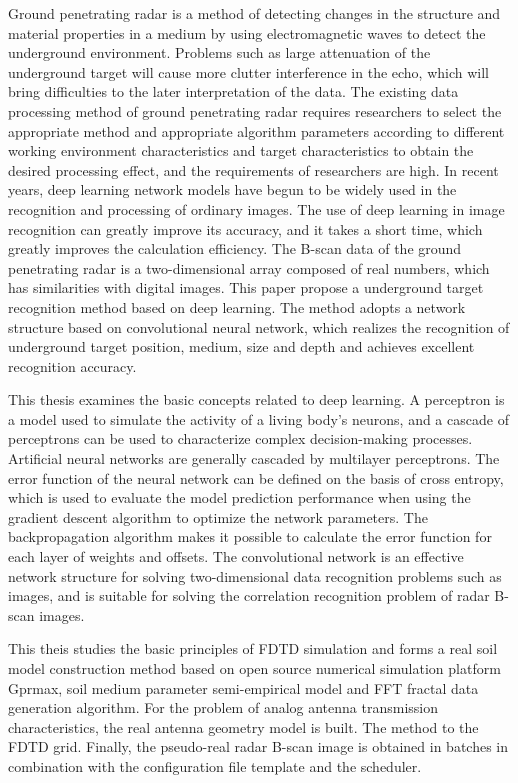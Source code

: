 
\begin{englishabstract}
	Ground penetrating radar is a method of detecting changes in the structure and material properties in a medium by using electromagnetic waves to detect the underground environment. Problems such as large attenuation of the underground target will cause more clutter interference in the echo, which will bring difficulties to the later interpretation of the data. The existing data processing method of ground penetrating radar requires researchers to select the appropriate method and appropriate algorithm parameters according to different working environment characteristics and target characteristics to obtain the desired processing effect, and the requirements of researchers are high. In recent years, deep learning network models have begun to be widely used in the recognition and processing of ordinary images. The use of deep learning in image recognition can greatly improve its accuracy, and it takes a short time, which greatly improves the calculation efficiency. The B-scan data of the ground penetrating radar is a two-dimensional array composed of real numbers, which has similarities with digital images. This paper propose a underground target recognition method based on deep learning. The method adopts a network structure based on convolutional neural network, which realizes the recognition of underground target position, medium, size and depth and achieves excellent recognition accuracy. 
	
	This thesis examines the basic concepts related to deep learning. A perceptron is a model used to simulate the activity of a living body's neurons, and a cascade of perceptrons can be used to characterize complex decision-making processes. Artificial neural networks are generally cascaded by multilayer perceptrons. The error function of the neural network can be defined on the basis of cross entropy, which is used to evaluate the model prediction performance when using the gradient descent algorithm to optimize the network parameters. The backpropagation algorithm makes it possible to calculate the error function for each layer of weights and offsets. The convolutional network is an effective network structure for solving two-dimensional data recognition problems such as images, and is suitable for solving the correlation recognition problem of radar B-scan images. 
	
	This theis studies the basic principles of FDTD simulation and forms a real soil model construction method based on open source numerical simulation platform Gprmax, soil medium parameter semi-empirical model and FFT fractal data generation algorithm. For the problem of analog antenna transmission characteristics, the real antenna geometry model is built. The method to the FDTD grid. Finally, the pseudo-real radar B-scan image is obtained in batches in combination with the configuration file template and the scheduler. 
	

\end{englishabstract}

